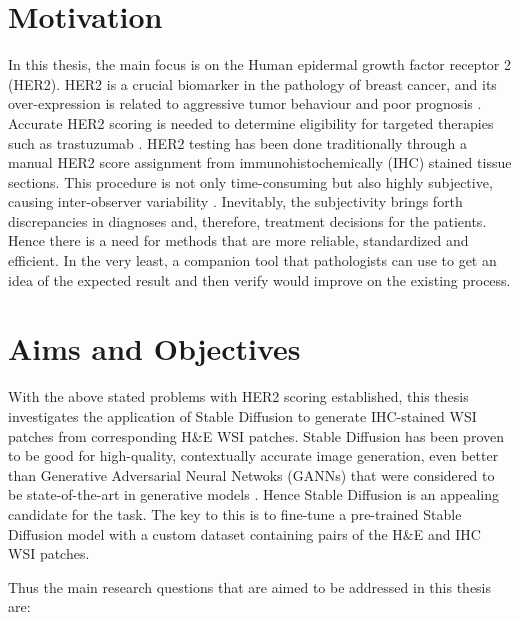 \section{Motivation}

In this thesis, the main focus is on the Human epidermal growth factor receptor 2 (HER2). HER2 is a crucial biomarker in the pathology of breast cancer, and its over-expression is related to aggressive tumor behaviour and poor prognosis \parencite{Slamon1987HumanOncogene}. Accurate HER2 scoring is needed to determine eligibility for targeted therapies such as trastuzumab \parencite{Slamon2001UseHER2}. HER2 testing has been done traditionally through a manual HER2 score assignment from immunohistochemically (IHC) stained tissue sections. This procedure is not only time-consuming but also highly subjective, causing inter-observer variability \parencite{Wolff2013RecommendationsUpdate.}. Inevitably, the subjectivity brings forth discrepancies in diagnoses and, therefore, treatment decisions for the patients. Hence there is a need for methods that are more reliable, standardized and efficient. In the very least, a companion tool that pathologists can use to get an idea of the expected result and then verify would improve on the existing process. 

\section{Aims and Objectives} 

With the above stated problems with HER2 scoring established, this thesis investigates the application of Stable Diffusion \parencite{Rombach2021High-ResolutionModels} to generate IHC-stained WSI patches from corresponding H\&E WSI patches. Stable Diffusion has been proven to be good for high-quality, contextually accurate image generation, even better than Generative Adversarial Neural Netwoks (GANNs) that were considered to be state-of-the-art in generative models \parencite{Baranchuk2021Label-EfficientModels}. Hence Stable Diffusion is an appealing candidate for the task. The key to this is to fine-tune a pre-trained Stable Diffusion model with a custom dataset containing pairs of the H\&E and IHC WSI patches. 

\vspace{5 mm}

Thus the main research questions that are aimed to be addressed in this thesis are:

